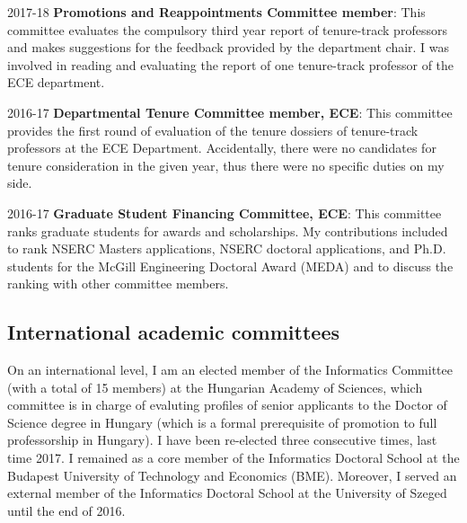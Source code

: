 \begin{yearlist}
\item[2017-18] \textbf{Promotions and Reappointments Committee member}: This committee evaluates the compulsory third year report of tenure-track professors and makes suggestions for the feedback provided by the department chair. I was involved in reading and evaluating the report of one tenure-track professor of the ECE department. 
\item[2016-17] \textbf{Departmental Tenure Committee member, ECE}: This committee provides the first round of evaluation of the tenure dossiers of tenure-track professors at the ECE Department. Accidentally, there were no candidates for tenure consideration in the given year, thus there were no specific duties on my side. 
\item[2016-17] \textbf{Graduate Student Financing Committee, ECE}: This committee ranks graduate students for awards and scholarships. My contributions included to rank NSERC Masters applications, NSERC doctoral applications, and Ph.D. students for the McGill Engineering Doctoral Award (MEDA) and to discuss the ranking with other committee members.
\end{yearlist}

\subsection{International academic committees}
On an international level, I am an elected member of the Informatics Committee (with a total of 15 members) at the Hungarian Academy of Sciences, which committee is in charge of evaluting profiles of senior applicants to the Doctor of Science degree in Hungary (which is a formal prerequisite of promotion to full professorship in Hungary). I have been re-elected three consecutive times, last time 2017. I remained as a core member of the Informatics Doctoral School at the Budapest University of Technology and Economics (BME). Moreover, I served an external member of the Informatics Doctoral School at the University of Szeged until the end of 2016.


 
